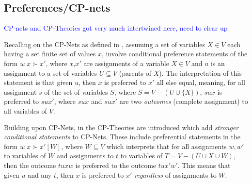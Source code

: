 \documentclass[sigconf,anonymous]{aamas}
\newcommand{\Mos}[1]{\textcolor{blue}{#1}}
\begin{document}
\subsection{Preferences/CP-nets}


\Mos{CP-nets and CP-Theories got very much intertwined here, need to clear up}

Recalling on the CP-Nets as defined in \cite{Boutilier2004}, assuming a set of variables $X \in V$ each having a set finite set of values $x$, involve conditional preference statements of the form $u : x \succ x'$, where $x$,$x'$ are assignments of a variable $X \in V$ and $u$ is an assignment to a set of variables $U \subseteq V$ (parents of $X$). The interpretation of this statement is that given $u$, then $x$ is preferred to $x'$ all else equal, meaning, for all assignment $s$ of the set of variables $S$, where $S = V - (U \cup \{X\})$, $sux$ is preferred to $sux'$, where $sux$ and $sux'$ are two \textit{outcomes} (complete assignment) to all variables of $V$. 

Building upon CP-Nets, in \cite{Wilson2004} the CP-Theories are introduced which add \textit{stronger conditional statements} to CP-Nets. These include preferential statements in the form $u : x \succ x' [W]$, where $W \subseteq V$ which interprets that for all assignments $w,w'$ to variables of $W$ and assignments to $t$ to variables of $T = V - (U \cup {X} \cup W)$, then the outcome $tuxw$ is preferred to the outcome $tux'w'$. This means that given $u$ and any $t$, then $x$ is preferred to $x'$ \textit{regardless} of assignments to $W$.
\end{document}
